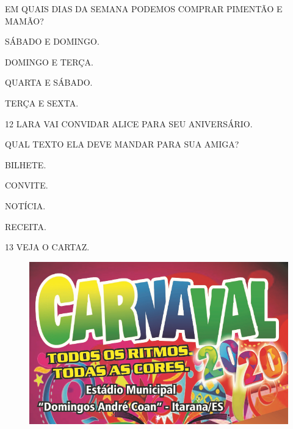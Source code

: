 
EM QUAIS DIAS DA SEMANA PODEMOS COMPRAR PIMENTÃO E MAMÃO?

\begin{escolha}
\item SÁBADO E DOMINGO.

\item DOMINGO E TERÇA.

\item QUARTA E SÁBADO.

\item TERÇA E SEXTA.
\end{escolha}

\num{12} LARA VAI CONVIDAR ALICE PARA SEU ANIVERSÁRIO.

QUAL TEXTO ELA DEVE MANDAR PARA SUA AMIGA? 

\begin{escolha}
\item BILHETE.

\item CONVITE.

\item NOTÍCIA.

\item RECEITA.
\end{escolha}

\pagebreak
\num{13} VEJA O CARTAZ.

\begin{figure}[htpb!]
\centering
\includegraphics[width=\textwidth]{media/image204.png}
\end{figure}

